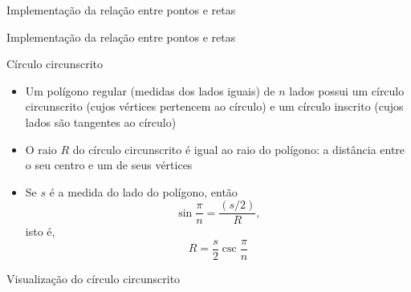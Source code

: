 \begin{frame}[fragile]{Implementação da relação entre pontos e retas}
\end{frame}

\begin{frame}[fragile]{Implementação da relação entre pontos e retas}
\end{frame}

\begin{frame}[fragile]{Círculo circunscrito}

    \begin{itemize}
        \item Um polígono regular (medidas dos lados iguais) de $n$ lados possui um círculo 
            circunscrito (cujos vértices pertencem ao círculo) e um círculo inscrito 
            (cujos lados são tangentes ao círculo)

        \item O raio $R$ do círculo circunscrito é igual ao raio do polígono: a distância entre o 
            seu centro e um de seus vértices

        \item Se $s$ é a medida do lado do polígono, então
        \[
            \sin \frac{\pi}{n} = \frac{(s/2)}{R},
        \]
        isto é,
        \[
            R = \frac{s}{2}\csc\frac{\pi}{n}
        \]

    \end{itemize}

\end{frame}

\begin{frame}[fragile]{Visualização do círculo circunscrito}

    \def\R{3}

    \begin{figure}
    \end{figure}

\end{frame}

